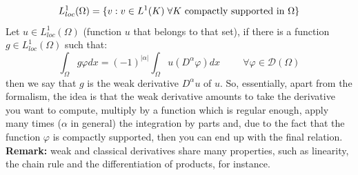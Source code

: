 \[
    L_{loc}^{1}(\Omega) = \{v:v\in L^1(K)\hspace{0.1cm} \forall K \text{ compactly supported in }\Omega \}    
\]
Let $u \in L^1_{loc}(\Omega)$ (function $u$ that belongs to that set), if there is a function $g \in L^1_{loc}(\Omega)$ such that:
\[
    \int_{\Omega} g\varphi dx = (-1)^{|\alpha|} \int_{\Omega} u(D^\alpha \varphi) dx \hspace{1cm} \forall \varphi \in \mathcal{D}(\Omega)    
\]
then we say that $g$ is the weak derivative $D^\alpha u$ of $u$.
So, essentially, apart from the formalism, the idea is that the weak derivative amounts to take the derivative you want to compute, multiply by a function which is regular enough, apply many times ($\alpha$ in general) the integration by parts and, due to the fact that the function $\varphi$ is compactly supported, then you can end up with the final relation.\\

\textbf{Remark:} weak and classical derivatives share many properties, such as linearity, the chain rule and the differentiation of products, for instance. \\


